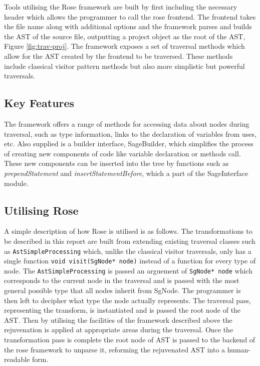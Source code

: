\documentclass[bsc,frontabs,singlespacing,twoside,parskip,deptreport]{infthesis}
\begin{document}
Tools utilising the Rose framework are built by first including the necessary header which allows the programmer to call the rose frontend. The frontend takes the file name along with additional options and the framework parses and builds the AST of the source file, outputting a project object as the root of the AST, Figure \ref{fig:trav-proj}. The framework exposes a set of traversal methods which allow for the AST created by the frontend to be traversed. These methods include classical visitor pattern methods but also more simplistic but powerful traversals. 

\subsection{Key Features}

The framework offers a range of methods for accessing data about nodes during traversal, such as type information, links to the declaration of variables from uses, etc. Also supplied is a builder interface, SageBuilder, which simplifies the process of creating new components of code like variable declaration or methods call. These new components can be inserted into the tree by functions such as \textit{prependStatement} and \textit{insertStatementBefore}, which a part of the SageInterface module. 


\subsection{Utilising Rose} \label{UTIL_ROSE}

A simple description of how Rose is utilised is as follows. The transformations to be described in this report are built from extending existing traversal classes such as  \texttt{AstSimpleProcessing} \cite{ROSE_MANUAL} which, unlike the classical visitor traversals, only has a single function \texttt{void visit(SgNode* node)} instead of a function for every type of node. The \texttt{AstSimpleProcessing} is passed an arguement of \texttt{SgNode* node} which corresponds to the current node in the traversal and is passed with the most general possible type that all nodes inherit from SgNode. The programmer is then left to decipher what type the node actually represents. The traversal pass, representing the transform, is instantiated and is passed the root node of the AST. Then by utilising the facilities of the framework described above the rejuvenation is applied at appropriate areas during the traversal. Once the transformation pass is complete the root node of AST is passed to the backend of the rose framework to unparse it, reforming the rejuvenated AST into a human-readable form.    
\end{document}
